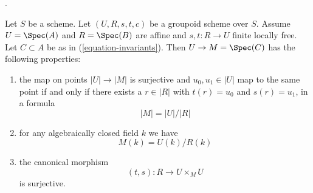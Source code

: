 \begin{lemma}
\label{lemma-points}
\begin{reference}
\cite[Expos\'e 212, Th\'eor\`eme 5.1 (ii) and Corollaire 5.2,
pp. 110--111]{FGA}.
\end{reference}
Let $S$ be a scheme. Let $(U, R, s, t, c)$ be a groupoid scheme over $S$.
Assume $U = \Spec(A)$ and $R = \Spec(B)$ are affine and
$s, t : R \to U$ finite locally free. Let $C \subset A$ be as in
(\ref{equation-invariants}). Then $U \to M = \Spec(C)$ has
the following properties:
\begin{enumerate}
\item the map on points $|U| \to |M|$ is surjective and
$u_0, u_1 \in |U|$ map to the same point if and only if
there exists a $r \in |R|$ with $t(r) = u_0$ and $s(r) = u_1$, in
a formula
$$
|M| = |U|/|R|
$$
\item for any algebraically closed field $k$ we have
$$
M(k) = U(k)/R(k)
$$
\item the canonical morphism
$$
(t, s) : R \longrightarrow U \times_M U
$$
is surjective.
\end{enumerate}
\end{lemma}

